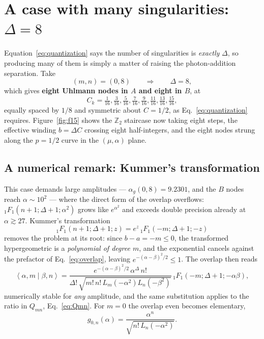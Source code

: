 \documentclass[11pt]{article}
\newcommand{\braket}[2]{\left\langle#1\middle|#2\right\rangle}
\newcommand{\hyp}[3]{{}_1F_1\!\left(#1;#2;#3\right)}
\begin{document}
\section{A case with many singularities: $\Delta=8$}
\label{sec:many}

Equation~\eqref{eq:quantization} says the number of singularities is
\emph{exactly} $\Delta$, so producing many of them is simply a matter of
raising the photon-addition separation. Take
\begin{equation}
(m,n)=(0,8)\qquad\Longrightarrow\qquad\Delta=8 ,
\end{equation}
which gives \textbf{eight Uhlmann nodes in $A$ and eight in $B$}, at
\begin{equation}
C_k=\tfrac{1}{16},\tfrac{3}{16},\tfrac{5}{16},\tfrac{7}{16},
\tfrac{9}{16},\tfrac{11}{16},\tfrac{13}{16},\tfrac{15}{16},
\end{equation}
equally spaced by $1/8$ and symmetric about $C=1/2$, as
Eq.~\eqref{eq:quantization} requires. Figure~\ref{fig:f15} shows the
$\mathbb{Z}_2$ staircase now taking eight steps, the effective winding
$b=\Delta C$ crossing eight half-integers, and the eight nodes strung along
the $p=1/2$ curve in the $(\mu,\alpha)$ plane.

\subsection{A numerical remark: Kummer's transformation}

This case demands large amplitudes --- $\alpha_g(0,8)=9.2301$, and the $B$
nodes reach $\alpha\sim10^2$ --- where the direct form of the overlap
overflows: $\hyp{n+1}{\Delta+1}{\alpha^2}$ grows like $e^{\alpha^2}$ and
exceeds double precision already at $\alpha\gtrsim27$. Kummer's transformation
\begin{equation}
\hyp{n+1}{\Delta+1}{z}=e^{z}\,\hyp{-m}{\Delta+1}{-z}
\label{eq:kummer}
\end{equation}
removes the problem at its root: since $b-a=-m\le0$, the transformed
hypergeometric is a \emph{polynomial of degree $m$}, and the exponential
cancels against the prefactor of Eq.~\eqref{eq:overlap}, leaving
$e^{-(\alpha-\beta)^2/2}\le1$. The overlap then reads
\begin{equation}
\braket{\alpha,m}{\beta,n}=
\frac{e^{-(\alpha-\beta)^2/2}\,\alpha^{\Delta}\,n!}
{\Delta!\,\sqrt{m!\,n!\,L_m(-\alpha^2)L_n(-\beta^2)}}\,
\hyp{-m}{\Delta+1}{-\alpha\beta} ,
\label{eq:overlap-stable}
\end{equation}
numerically stable for \emph{any} amplitude, and the same substitution applies
to the ratio in $Q_{mn}$, Eq.~\eqref{eq:Qmn}. For $m=0$ the overlap even
becomes elementary,
\begin{equation}
g_{0,n}(\alpha)=\frac{\alpha^{n}}{\sqrt{n!\,L_n(-\alpha^2)}} .
\end{equation}
\end{document}
